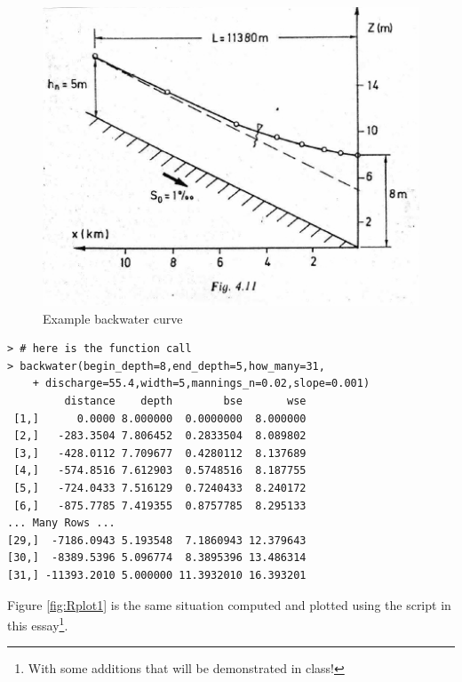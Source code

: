 \begin{figure}[h!] %
   \centering
   \includegraphics[width=5in]{bw_curve1.jpg} 
   \caption{Example backwater curve} 
   \label{fig:example1}
\end{figure}
\newpage
\begin{lstlisting}[caption=R Console Output when script is run \\ , label=lst:backwaterConsole]
> # here is the function call
> backwater(begin_depth=8,end_depth=5,how_many=31,
    + discharge=55.4,width=5,mannings_n=0.02,slope=0.001)
         distance    depth        bse       wse
 [1,]      0.0000 8.000000  0.0000000  8.000000
 [2,]   -283.3504 7.806452  0.2833504  8.089802
 [3,]   -428.0112 7.709677  0.4280112  8.137689
 [4,]   -574.8516 7.612903  0.5748516  8.187755
 [5,]   -724.0433 7.516129  0.7240433  8.240172
 [6,]   -875.7785 7.419355  0.8757785  8.295133
... Many Rows ...
[29,]  -7186.0943 5.193548  7.1860943 12.379643
[30,]  -8389.5396 5.096774  8.3895396 13.486314
[31,] -11393.2010 5.000000 11.3932010 16.393201
\end{lstlisting} 

Figure \ref{fig:Rplot1} is the same situation computed and plotted using the script in this essay\footnote{With some additions that will be demonstrated in class!}.

